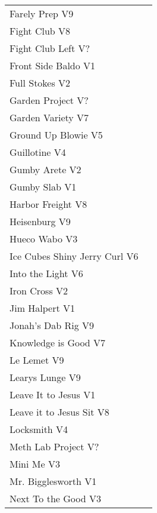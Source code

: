 \begin{center}
\begin{supertabular}{lr}
Farely Prep V9 & \pageref{rt:Farely Prep} \\
Fight Club V8 & \pageref{rt:Fight Club} \\
Fight Club Left V? & \pageref{rt:Fight Club Left} \\
Front Side Baldo V1 & \pageref{rt:Front Side Baldo} \\
Full Stokes V2 & \pageref{rt:Full Stokes} \\
Garden Project V? & \pageref{rt:Garden Project} \\
Garden Variety V7 & \pageref{rt:Garden Variety} \\
Ground Up Blowie V5 & \pageref{rt:Ground Up Blowie} \\
Guillotine V4 & \pageref{rt:Guillotine} \\
Gumby Arete V2 & \pageref{rt:Gumby Arete} \\
Gumby Slab V1 & \pageref{rt:Gumby Slab} \\
Harbor Freight V8 & \pageref{vr:Harbor Freight} \\
Heisenburg V9 & \pageref{rt:Heisenburg} \\
Hueco Wabo V3 & \pageref{rt:Hueco Wabo} \\
Ice Cubes Shiny Jerry Curl V6 & \pageref{rt:Ice Cubes Shiny Jerry Curl} \\
Into the Light V6 & \pageref{rt:Into the Light} \\
Iron Cross V2 & \pageref{vr:Iron Cross} \\
Jim Halpert V1 & \pageref{rt:Jim Halpert} \\
Jonah's Dab Rig V9 & \pageref{rt:Jonah's Dab Rig} \\
Knowledge is Good V7 & \pageref{rt:Knowledge is Good} \\
Le Lemet V9 & \pageref{rt:Le Lemet} \\
Learys Lunge V9 & \pageref{rt:Learys Lunge} \\
Leave It to Jesus V1 & \pageref{rt:Leave It to Jesus} \\
Leave it to Jesus Sit V8 & \pageref{vr:Leave it to Jesus Sit} \\
Locksmith V4 & \pageref{rt:Locksmith} \\
Meth Lab Project V? & \pageref{rt:Meth Lab Project} \\
Mini Me V3 & \pageref{rt:Mini Me} \\
Mr. Bigglesworth V1 & \pageref{vr:Mr. Bigglesworth} \\
Next To the Good V3 & \pageref{rt:Next To the Good} \\

\end{supertabular}
\end{center}
